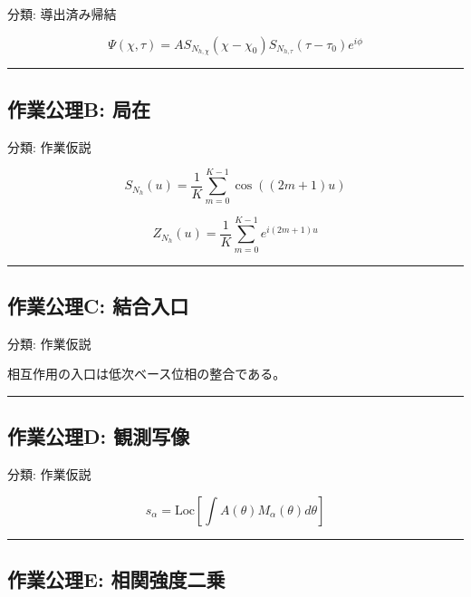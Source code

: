 \documentclass[
  a4paper,
]{ltjsarticle}
\begin{document}
分類: 導出済み帰結

\[
\Psi(\chi,\tau)=A S_{N_{h,\chi}}(\chi-\chi_0)S_{N_{h,\tau}}(\tau-\tau_0)e^{i\phi}
\]

\begin{center}\rule{0.5\linewidth}{0.5pt}\end{center}

\subsection{作業公理B:
局在}\label{ux4f5cux696dux516cux7406b-ux5c40ux5728}

分類: 作業仮説

\[
S_{N_h}(u)=\frac{1}{K}\sum_{m=0}^{K-1}\cos((2m+1)u)
\]

\[
Z_{N_h}(u)=\frac{1}{K}\sum_{m=0}^{K-1}e^{i(2m+1)u}
\]

\begin{center}\rule{0.5\linewidth}{0.5pt}\end{center}

\subsection{作業公理C:
結合入口}\label{ux4f5cux696dux516cux7406c-ux7d50ux5408ux5165ux53e3}

分類: 作業仮説

相互作用の入口は低次ベース位相の整合である。

\begin{center}\rule{0.5\linewidth}{0.5pt}\end{center}

\subsection{作業公理D:
観測写像}\label{ux4f5cux696dux516cux7406d-ux89b3ux6e2cux5199ux50cf}

分類: 作業仮説

\[
s_\alpha=\mathrm{Loc}\left[\int A(\theta)M_\alpha(\theta)d\theta\right]
\]

\begin{center}\rule{0.5\linewidth}{0.5pt}\end{center}

\subsection{作業公理E:
相関強度二乗}\label{ux4f5cux696dux516cux7406e-ux76f8ux95a2ux5f37ux5ea6ux4e8cux4e57}
\end{document}

